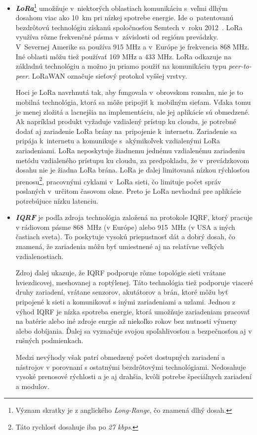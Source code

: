 \begin{itemize}
    \item \textit{\textbf{LoRa}}\footnote{Význam skratky je z anglického \emph{Long-Range}, čo znamená dlhý dosah.} umožňuje v~niektorých oblastiach komunikáciu s~veľmi dlhým dosahom viac ako 10~km pri nízkej spotrebe energie. 
    Ide o~patentovanú bezdrôtovú technológiu získanú spoločnosťou Semtech v~roku 2012~\cite{slats_2021}.
    LoRa využíva rôzne frekvenčné pásma v~závislosti od regiónu prevádzky. 
    V~Severnej Amerike sa používa 915 MHz a v~Európe je frekvencia 868 MHz. 
    Iné oblasti môžu tiež používať 169 MHz a 433 MHz. 
    LoRa odkazuje na základnú technológiu a možno ju priamo použiť na komunikáciu typu \textit{peer-to-peer}. 
    LoRaWAN označuje sieťový protokol vyššej vrstvy.~\cite{elkhodr2016emerging}

    Hoci je LoRa navrhnutá tak, aby fungovala v~obrovskom rozsahu, nie je to mobilná technológia, ktorá sa môže pripojiť k~mobilným sieťam. 
    Vďaka tomu je menej zložitá a lacnejšia na implementáciu, ale jej aplikácie sú obmedzené. 
    Ak napríklad produkt vyžaduje vzdialený prístup ku cloudu, je potrebné dodať aj zariadenie LoRa brány na~pripojenie k~internetu. 
    Zariadenie sa pripája k~internetu a komunikuje s~akýmikoľvek vzdialenými LoRa zariadeniami. 
    LoRa neposkytuje žiadnemu jednému vzdialenému zariadeniu metódu vzdialeného prístupu ku cloudu, za predpokladu, že v~prevádzkovom dosahu nie je žiadna LoRa brána. 
    LoRa je ďalej limitovaná nízkou rýchlosťou prenosu\footnote{Táto rychlosť dosahuje iba po \emph{27 kbps}.}, pracovnými cyklami v~LoRa sieti, čo limituje počet správ poslaných v~určitom časovom okne.
    Preto je LoRa nevhodná pre aplikácie potrebújuce nízku latenciu.~\cite{8474715}

    \item \textit{\textbf{IQRF}} je podľa zdroja \cite{IQRF} technológia založená na protokole IQRF, ktorý pracuje v rádiovom pásme 868~MHz (v Európe) alebo 915~MHz (v USA a iných častiach sveta). To poskytuje vysokú priepustnosť dát a dobrý dosah, čo znamená, že zariadenia môžu byť umiestnené aj na relatívne veľkých vzdialenostiach.

    Zdroj \cite{IQRF} ďalej ukazuje, že IQRF podporuje rôzne topológie sieti vrátane hviezdicovej, meshovanej a roptýlenej. Táto technológia tiež podporuje viaceré druhy zariadení, vrátane senzorov, akutátorov a brán, ktoré môžu byť pripojené k sieti a komunikovať s inými zariadeniami a uzlami.
    Jednou z výhod IQRF je nízka spotreba energie, ktorá umožňuje zariadeniam pracovať na batérie alebo iné zdroje enrgie až niekoľko rokov bez nutnosti výmeny alebo dobíjania. Ďalej sa vyznačuje svojou spoľahlivosťou a bezpečnosťou aj v rušných podmienkach.

    Medzi nevýhody však patrí obmedzený počet dostupných zariadení a nástrojov v porovnaní s ostatnými bezdrôtovými technológiami. Nedosahuje vysoké prenosové rýchlosti a je aj drahšia, kvôli potrebe špeciálnych zariadení a modulov.
\end{itemize}

